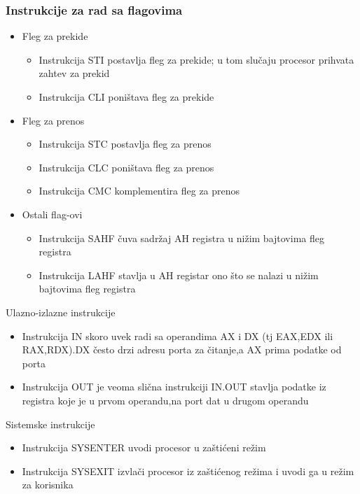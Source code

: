 \documentclass[hyperref={pdfpagelabels=false}]{beamer}
\begin{document}
	\begin{frame}
		\frametitle{Instrukcije za rad sa flagovima} 
		\begin{itemize}
			\item Fleg za prekide\pause 
				\begin{itemize}
					\item Instrukcija STI postavlja fleg za prekide; u tom slu\v caju procesor prihvata zahtev za prekid\pause
					\item Instrukcija CLI poni\v stava fleg za prekide\pause
				\end{itemize}
			\item Fleg za prenos
				\begin{itemize}
					\item Instrukcija STC postavlja fleg za prenos\pause
					\item Instrukcija CLC poni\v stava fleg za prenos\pause
					\item Instrukcija CMC komplementira fleg za prenos\pause
				\end{itemize}
			\item Ostali flag-ovi
				\begin{itemize}
					\item Instrukcija SAHF \v cuva sadr\v zaj AH registra u ni\v zim bajtovima fleg registra\pause
					\item Instrukcija LAHF stavlja u AH registar ono \v sto se nalazi u ni\v zim bajtovima fleg registra\pause
				\end{itemize}
		\end{itemize}
	\end{frame}
	
	
	\begin{frame}
		Ulazno-izlazne instrukcije
		\begin{itemize}
			\item \pause Instrukcija IN skoro uvek radi sa operandima AX i DX (tj EAX,EDX ili RAX,RDX).DX \v cesto drzi adresu porta za \v citanje,a AX prima
			podatke od porta\pause
			\item Instrukcija OUT je veoma sli\v cna instrukciji IN.OUT stavlja podatke iz registra koje je u prvom operandu,na port dat u drugom operandu
		\end{itemize}
		
		Sistemske instrukcije
		\begin{itemize}
			\item \pause Instrukcija SYSENTER uvodi procesor u za\v sti\' ceni re\v zim \pause
			\item Instrukcija SYSEXIT izvla\v ci procesor iz za\v sti\' cenog re\v zima i uvodi ga u re\v zim za korisnika
		\end{itemize}		
	\end{frame}

	

	
	
	
	
\end{document}
